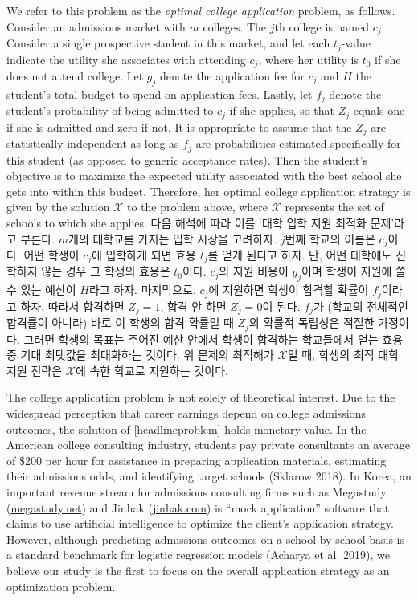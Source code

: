 \documentclass[11pt]{article} %
\theoremstyle{definition}
\theoremstyle{definition}
\begin{document}
\ifen
We refer to this problem as the \emph{optimal college application} problem, as follows. Consider an admissions market with $m$ colleges. The $j$th college is named $c_j$. Consider a single prospective student in this market, and let each $t_j$-value indicate the utility she associates with attending $c_j$, where her utility is $t_0$ if she does not attend college. Let $g_j$ denote the application fee for $c_j$ and $H$ the student's total budget to spend on application fees. Lastly, let $f_j$ denote the student's probability of being admitted to $c_j$ if she applies, so that $Z_j$ equals one if she is admitted and zero if not. It is appropriate to assume that the $Z_j$ are statistically independent as long as $f_j$ are probabilities estimated specifically for this student (as opposed to generic acceptance rates). Then the student's objective is to maximize the expected utility associated with the best school she gets into within this budget. Therefore, her optimal college application strategy is given by the solution $\mathcal{X}$ to the problem above, where $\mathcal{X}$ represents the set of schools to which she applies. 
\else
다음 해석에 따라 이를 `대학 입학 지원 최적화 문제'라고 부른다. $m$개의 대학교를 가지는 입학 시장을 고려하자. $j$번째 학교의 이름은 $c_j$이다. 어떤 학생이 $c_j$에 입학하게 되면 효용 $t_j$를 얻게 된다고 하자. 단, 어떤 대학에도 진학하지 않는 경우 그 학생의 효용은 $t_0$이다. $c_j$의 지원 비용이 $g_j$이며 학생이 지원에 쓸 수 있는 예산이 $H$라고 하자. 마지막으로, $c_j$에 지원하면 학생이 합격할 확률이 $f_j$이라고 하자. 따라서 합격하면 $Z_j = 1$, 합격 안 하면 $Z_j = 0$이 된다. $f_j$가 (학교의 전체적인 합격률이 아니라) 바로 이 학생의 합격 확률일 때 $Z_j$의 확률적 독립성은 적절한 가정이다. 그러면 학생의 목표는 주어진 예산 안에서 학생이 합격하는 학교들에서 얻는 효용 중 기대 최댓값을 최대화하는 것이다. 위 문제의 최적해가 $\mathcal{X}$일 때, 학생의 최적 대학 지원 전략은 $\mathcal{X}$에  속한 학교로 지원하는 것이다.
\fi

\ifen
The college application problem is not solely of theoretical interest. Due to the widespread perception that career earnings depend on college admissions outcomes, the solution of \eqref{headlineproblem} holds monetary value. In the American college consulting industry, students pay private consultants an average of \$200 per hour for assistance in preparing application materials, estimating their admissions odds, and identifying target schools (Sklarow 2018). In Korea, an important revenue stream for admissions consulting firms such as Megastudy (\url{megastudy.net}) and Jinhak (\url{jinhak.com}) is ``mock application'' software that claims to use artificial intelligence to optimize the client's application strategy. However, although predicting admissions outcomes on a school-by-school basis is a standard benchmark for logistic regression models (Acharya et al. 2019), we believe our study is the first to focus on the overall application strategy as an optimization problem.
\end{document}
